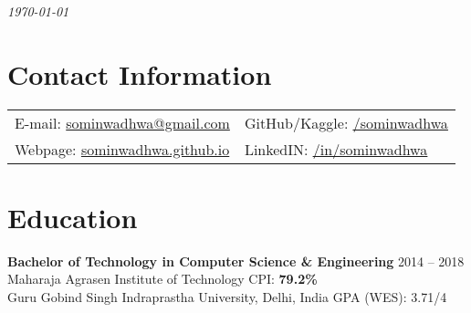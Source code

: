 \documentclass[margin,line]{res}
\begin{document}
 \hfill {\em \today}

\begin{resume}
\section{\sc Contact Information}

\vspace{.025in}
\begin{tabular}{@{}p{3.5in}p{3in}}
{E-mail:}  \href{mailto:sominwadhwa@gmail.com}{sominwadhwa@gmail.com} & {GitHub/Kaggle:} {\href{https://github.com/sominwadhwa}{\underline{/sominwadhwa}}}\\
{Webpage:} {\href{https://sominwadhwa.github.io}{sominwadhwa.github.io}} & {LinkedIN:} {\href{https://www.linkedin.com/in/sominwadhwa/}{\underline{/in/sominwadhwa}}}\\
\end{tabular}

\section{\sc Education}
{\bf Bachelor of Technology in Computer Science \& Engineering} \hfill 2014 -- 2018\\
Maharaja Agrasen Institute of Technology \hfill CPI: {\bf 79.2\%}\\
Guru Gobind Singh Indraprastha University, Delhi, India \hfill GPA (WES): 3.71/4


\end{resume}
\end{document}
